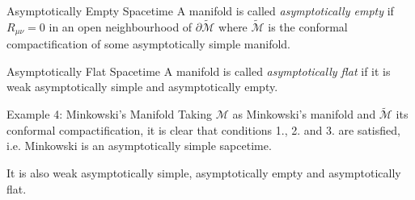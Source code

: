 \documentclass{beamer}
\begin{document}
\begin{darkframes}
        \begin{frame}{Asymptotically Empty Spacetime}
        	A manifold is called \emph{asymptotically empty }if $R_{\mu\nu}=0$
in an open neighbourhood of \emph{$\partial\tilde{\mathcal{M}}$}
where $\tilde{\mathcal{M}}$ is the conformal compactification of some asymptotically simple manifold.
        \end{frame}
        
        \begin{frame}{Asymptotically Flat Spacetime}
        	A manifold is called \emph{asymptotically flat }if it is weak asymptotically simple and asymptotically empty.
        \end{frame}
  \end{darkframes}
  
        \begin{frame}{Example 4: Minkowski's Manifold}
           	Taking $\mathcal{M}$ as Minkowski's manifold  and $\tilde{\mathcal{M}}$ its conformal compactification, it is clear
that conditions 1., 2. and 3. are satisfied, i.e. Minkowski is an
asymptotically simple sapcetime. \\
\pause

It is also weak asymptotically simple,
asymptotically empty and asymptotically flat. 
        \end{frame}
        
\end{document}
